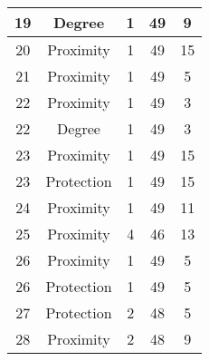 \documentclass[results.tex]{subfiles}
\begin{document}
\begin{center}
\begin{tabular}{| c || c | c | c | c |}
            \hline
            19                      & Degree                       & 1                      & 49                      & 9                    \\
            \hline
            20                      & Proximity                    & 1                      & 49                      & 15                   \\
            \hline
            21                      & Proximity                    & 1                      & 49                      & 5                    \\
            \hline
            22                      & Proximity                    & 1                      & 49                      & 3                    \\
            \hline
            22                      & Degree                       & 1                      & 49                      & 3                    \\
            \hline
            23                      & Proximity                    & 1                      & 49                      & 15                   \\
            \hline
            23                      & Protection                   & 1                      & 49                      & 15                   \\
            \hline
            24                      & Proximity                    & 1                      & 49                      & 11                   \\
            \hline
            25                      & Proximity                    & 4                      & 46                      & 13                   \\
            \hline
            26                      & Proximity                    & 1                      & 49                      & 5                    \\
            \hline
            26                      & Protection                   & 1                      & 49                      & 5                    \\
            \hline
            27                      & Protection                   & 2                      & 48                      & 5                    \\
            \hline
            28                      & Proximity                    & 2                      & 48                      & 9                    \\

\end{tabular}
\end{center}
\end{document}
